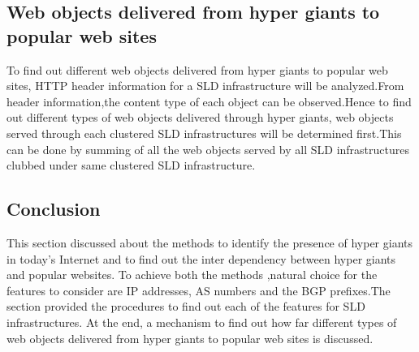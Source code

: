 \subsection{Web objects delivered from hyper giants to popular web sites}
To find out different web objects delivered from hyper giants to popular web sites, HTTP header information for a SLD infrastructure will be analyzed.From header information,the content type of each object can be observed.Hence to find out different types of web objects delivered through hyper giants, web objects served through each clustered SLD infrastructures will be determined first.This can be done by summing of all the web objects served by all SLD infrastructures clubbed under same clustered SLD infrastructure. 
\subsection{Conclusion}
This section discussed about the methods to identify the presence of hyper giants in today's Internet and to find out the inter dependency between hyper giants and popular websites. To achieve both the methods ,natural choice for the features to consider are IP addresses, AS numbers and the BGP prefixes.The section provided the procedures to find out each of the features for SLD infrastructures. At the end, a mechanism to find out how far different types of web objects delivered from hyper giants to popular web sites is discussed.